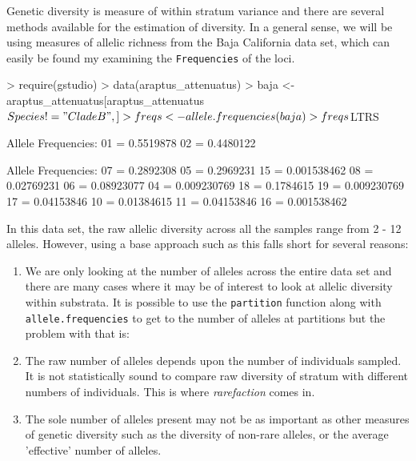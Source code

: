 \documentclass[letterpaper,twoside,openany]{book}
\begin{document}
Genetic diversity is measure of within stratum variance and there are several methods available for the estimation of diversity.  In a general sense, we will be using measures of allelic richness from the Baja California data set, which can easily be found my examining the \texttt{Frequencies} of the loci.

\begin{Schunk}
\begin{Sinput}
> require(gstudio)
> data(araptus_attenuatus)
> baja <- araptus_attenuatus[araptus_attenuatus$Species != "CladeB",]
> freqs <- allele.frequencies(baja)
> freqs$LTRS
\end{Sinput}
\begin{Soutput}
Allele Frequencies:
  01 = 0.5519878 
  02 = 0.4480122 
\end{Soutput}
\begin{Soutput}
Allele Frequencies:
  07 = 0.2892308 
  05 = 0.2969231 
  15 = 0.001538462 
  08 = 0.02769231 
  06 = 0.08923077 
  04 = 0.009230769 
  18 = 0.1784615 
  19 = 0.009230769 
  17 = 0.04153846 
  10 = 0.01384615 
  11 = 0.04153846 
  16 = 0.001538462 
\end{Soutput}
\end{Schunk}

In this data set, the raw allelic diversity across all the samples range from 2 - 12 alleles.  However, using a base approach such as this falls short for several reasons:

\begin{enumerate}
	\item We are only looking at the number of alleles across the entire data set and there are many cases where it may be of interest to look at allelic diversity within substrata.  It is possible to use the \texttt{partition} function along with \texttt{allele.frequencies} to get to the number of alleles at partitions but the problem with that is:
	\item The raw number of alleles depends upon the number of individuals sampled.  It is not statistically sound to compare raw diversity of stratum with different numbers of individuals.  This is where \emph{rarefaction} comes in.
	\item The sole number of alleles present may not be as important as other measures of genetic diversity such as the diversity of non-rare alleles, or the average 'effective' number of alleles.
\end{enumerate}
\end{document}
